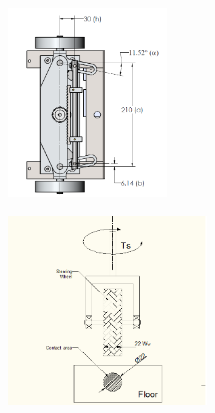 \begin{figure}
	\centering
	\begin{minipage}{.5\textwidth}
		\centering
		\includegraphics[width=\linewidth,height=5cm,keepaspectratio]{Chapter3/fig/davis}
		\label{fig:davis}
	\end{minipage}%
	\begin{minipage}{.5\textwidth}
		\centering
		\includegraphics[width=\linewidth,height=5cm,keepaspectratio]{Chapter3/fig/steerTorqCal}
		\label{fig:steerTorq}
	\end{minipage}	
\end{figure} 

